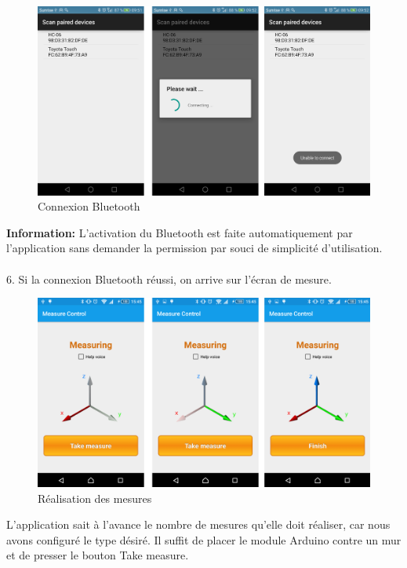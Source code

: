 \begin{figure}[H]
	\begin{center}
		\includegraphics[width=14cm]{img/bluetooth.png}
		\caption{Connexion Bluetooth}
		\label{bluetooth}
	\end{center}
\end{figure}
\textbf{Information: } L'activation du Bluetooth est faite automatiquement par l'application sans demander la permission par souci de simplicité d'utilisation.\\\\
6. Si la connexion Bluetooth réussi, on arrive sur l'écran de mesure.
\begin{figure}[H]
	\begin{center}
		\includegraphics[width=14cm]{img/measuring.png}
		\caption{Réalisation des mesures}
		\label{measuring}
	\end{center}
\end{figure}
L'application sait à l'avance le nombre de mesures qu'elle doit réaliser, car nous avons configuré le type désiré. Il suffit de placer le module Arduino contre un mur et de presser le bouton Take measure.\\
